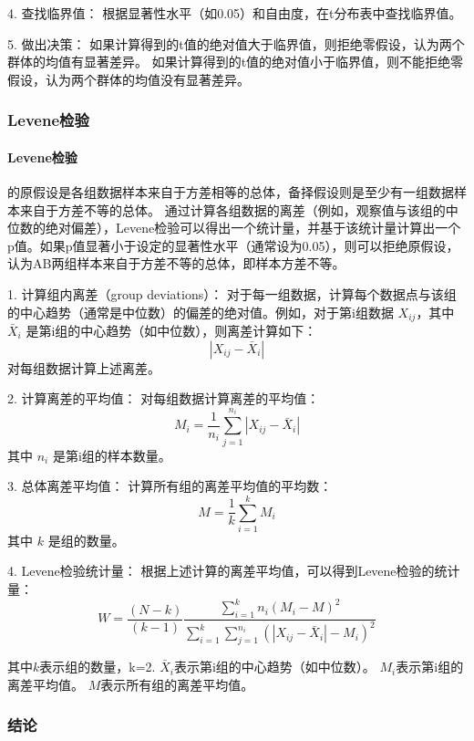 \documentclass[withoutpreface,bwprint]{cumcmthesis} %
\begin{document}
4. 查找临界值：
   根据显著性水平（如0.05）和自由度，在t分布表中查找临界值。

5. 做出决策：
   如果计算得到的t值的绝对值大于临界值，则拒绝零假设，认为两个群体的均值有显著差异。
   如果计算得到的t值的绝对值小于临界值，则不能拒绝零假设，认为两个群体的均值没有显著差异。



\subsubsection{Levene检验}

\paragraph*{Levene检验}的原假设是各组数据样本来自于方差相等的总体，备择假设则是至少有一组数据样本来自于方差不等的总体。
通过计算各组数据的离差（例如，观察值与该组的中位数的绝对偏差），Levene检验可以得出一个统计量，并基于该统计量计算出一个p值。如果p值显著小于设定的显著性水平（通常设为0.05），则可以拒绝原假设，认为AB两组样本来自于方差不等的总体，即样本方差不等。

1. 计算组内离差（group deviations）：
   对于每一组数据，计算每个数据点与该组的中心趋势（通常是中位数）的偏差的绝对值。例如，对于第i组数据 \( X_{ij} \)，其中 \( \bar{X}_i \) 是第i组的中心趋势（如中位数），则离差计算如下：
   \[
   |X_{ij} - \bar{X}_i|
   \]
   对每组数据计算上述离差。

2. 计算离差的平均值：
   对每组数据计算离差的平均值：
   \[
   M_i = \frac{1}{n_i} \sum_{j=1}^{n_i} |X_{ij} - \bar{X}_i|
   \]
   其中 \( n_i \) 是第i组的样本数量。

3. 总体离差平均值：
   计算所有组的离差平均值的平均数：
   \[
   M = \frac{1}{k} \sum_{i=1}^{k} M_i
   \]
   其中 \( k \) 是组的数量。

4. Levene检验统计量：
   根据上述计算的离差平均值，可以得到Levene检验的统计量：
\begin{equation}
    W = \frac{(N-k)}{(k-1)} \frac{\sum_{i=1}^{k} n_i (M_i - M)^2}{\sum_{i=1}^{k} \sum_{j=1}^{n_i} (|X_{ij} - \bar{X}_i| - M_i)^2}
\label{eq:Levene}
\end{equation}


其中\( k \)表示组的数量，k=2.
\( \bar{X}_i \)表示第i组的中心趋势（如中位数）。
\( M_i \)表示第i组的离差平均值。
\( M \)表示所有组的离差平均值。



\subsubsection{结论}
\end{document}
